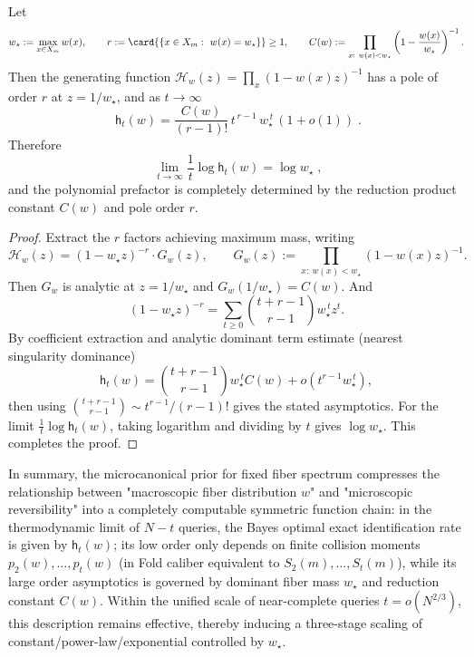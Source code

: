 \begin{theorem}\label{thm:pom-microcanonical-fold-dominant-pole-asymptotics}
Let
\[
w_\star:=\max_{x\in X_m} w(x),
\qquad
r:=\card{\{x\in X_m:\ w(x)=w_\star\}}\ge 1,
\qquad
C(w):=\prod_{x:\ w(x)<w_\star}\left(1-\frac{w(x)}{w_\star}\right)^{-1}.
\]
Then the generating function \(\mathcal{H}_w(z)=\prod_x(1-w(x)z)^{-1}\) has a pole of order \(r\) at \(z=1/w_\star\), and as \(t\to\infty\)
\[
\boxed{\;
\mathsf{h}_t(w)=\frac{C(w)}{(r-1)!}\,t^{\,r-1}\,w_\star^{\,t}\,(1+o(1))\; } .
\]
Therefore
\[
\boxed{\;
\lim_{t\to\infty}\frac{1}{t}\log \mathsf{h}_t(w)=\log w_\star\; } ,
\]
and the polynomial prefactor is completely determined by the reduction product constant \(C(w)\) and pole order \(r\).
\end{theorem}
\begin{proof}
Extract the \(r\) factors achieving maximum mass, writing
\[
\mathcal{H}_w(z)=(1-w_\star z)^{-r}\cdot G_w(z),
\qquad
G_w(z):=\prod_{x:\ w(x)<w_\star}(1-w(x)z)^{-1}.
\]
Then \(G_w\) is analytic at \(z=1/w_\star\) and \(G_w(1/w_\star)=C(w)\).
And
\[
(1-w_\star z)^{-r}=\sum_{t\ge 0}\binom{t+r-1}{r-1}w_\star^{\,t}z^t.
\]
By coefficient extraction and analytic dominant term estimate (nearest singularity dominance)
\[
\mathsf{h}_t(w)=\binom{t+r-1}{r-1}w_\star^{\,t}C(w)+o\!\left(t^{r-1}w_\star^{\,t}\right),
\]
then using \(\binom{t+r-1}{r-1}\sim t^{r-1}/(r-1)!\) gives the stated asymptotics.
For the limit \(\frac{1}{t}\log \mathsf{h}_t(w)\), taking logarithm and dividing by \(t\) gives \(\log w_\star\). This completes the proof.
\end{proof}



In summary, the microcanonical prior for fixed fiber spectrum compresses the relationship between "macroscopic fiber distribution \(w\)" and "microscopic reversibility" into a completely computable symmetric function chain:
in the thermodynamic limit of \(N-t\) queries, the Bayes optimal exact identification rate is given by \(\mathsf{h}_t(w)\);
its low order only depends on finite collision moments \(p_2(w),\dots,p_t(w)\) (in Fold caliber equivalent to \(S_2(m),\dots,S_t(m)\)),
while its large order asymptotics is governed by dominant fiber mass \(w_\star\) and reduction constant \(C(w)\).
Within the unified scale of near-complete queries \(t=o(N^{2/3})\), this description remains effective, thereby inducing a three-stage scaling of constant/power-law/exponential controlled by \(w_\star\).

\endinput


